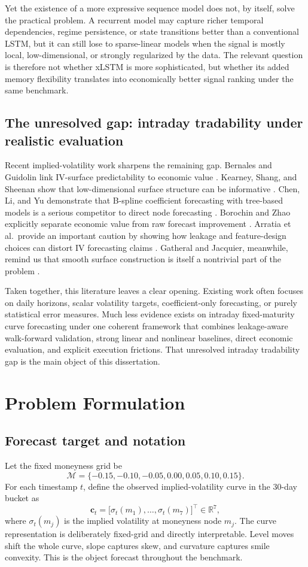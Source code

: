 \documentclass[12pt]{report}
\begin{document}
Yet the existence of a more expressive sequence model does not, by itself, solve the practical problem. A recurrent model may capture richer temporal dependencies, regime persistence, or state transitions better than a conventional LSTM, but it can still lose to sparse-linear models when the signal is mostly local, low-dimensional, or strongly regularized by the data. The relevant question is therefore not whether xLSTM is more sophisticated, but whether its added memory flexibility translates into economically better signal ranking under the same benchmark.

\section{The unresolved gap: intraday tradability under realistic evaluation}
Recent implied-volatility work sharpens the remaining gap. Bernales and Guidolin link IV-surface predictability to economic value \citep{bernales2014}. Kearney, Shang, and Sheenan show that low-dimensional surface structure can be informative \citep{kearney2019}. Chen, Li, and Yu demonstrate that B-spline coefficient forecasting with tree-based models is a serious competitor to direct node forecasting \citep{chen2024bspline}. Borochin and Zhao explicitly separate economic value from raw forecast improvement \citep{borochin2025}. Arratia et al.\ provide an important caution by showing how leakage and feature-design choices can distort IV forecasting claims \citep{arratia2025}. Gatheral and Jacquier, meanwhile, remind us that smooth surface construction is itself a nontrivial part of the problem \citep{gatheral2014arbitrage}.

Taken together, this literature leaves a clear opening. Existing work often focuses on daily horizons, scalar volatility targets, coefficient-only forecasting, or purely statistical error measures. Much less evidence exists on intraday fixed-maturity curve forecasting under one coherent framework that combines leakage-aware walk-forward validation, strong linear and nonlinear baselines, direct economic evaluation, and explicit execution frictions. That unresolved intraday tradability gap is the main object of this dissertation.

\chapter{Problem Formulation}

\section{Forecast target and notation}
Let the fixed moneyness grid be
\[
\mathcal{M}=\{-0.15,-0.10,-0.05,0.00,0.05,0.10,0.15\}.
\]
For each timestamp \(t\), define the observed implied-volatility curve in the 30-day bucket as
\[
\mathbf{c}_t=\big[\sigma_t(m_1),\ldots,\sigma_t(m_7)\big]^\top \in \mathbb{R}^7,
\]
where \(\sigma_t(m_j)\) is the implied volatility at moneyness node \(m_j\). The curve representation is deliberately fixed-grid and directly interpretable. Level moves shift the whole curve, slope captures skew, and curvature captures smile convexity. This is the object forecast throughout the benchmark.
\end{document}
